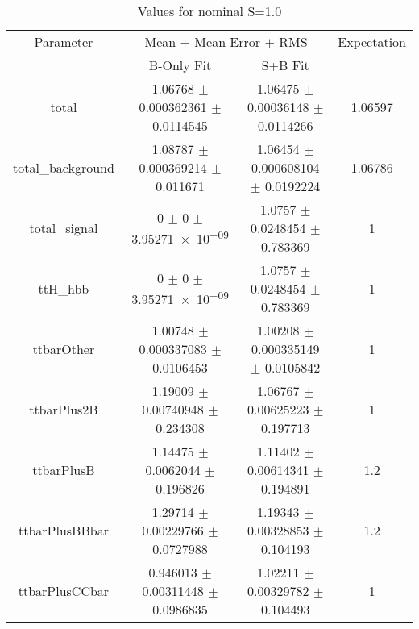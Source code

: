 \begin{table}
\centering
\caption{Values for nominal S=1.0}
\begin{tabular}{cccc}
\toprule
Parameter & \multicolumn{2}{c}{Mean $\pm$ Mean Error $\pm$ RMS} & Expectation\\
 & B-Only Fit & S+B Fit & \\
\midrule
total & \num{1.06768} $\pm$ \num{0.000362361} $\pm$ \num{0.0114545} & \num{1.06475} $\pm$ \num{0.00036148} $\pm$ \num{0.0114266} & \num{1.06597}\\
total\_background & \num{1.08787} $\pm$ \num{0.000369214} $\pm$ \num{0.011671} & \num{1.06454} $\pm$ \num{0.000608104} $\pm$ \num{0.0192224} & \num{1.06786}\\
total\_signal & \num{0} $\pm$ \num{0} $\pm$ \num{3.95271e-09} & \num{1.0757} $\pm$ \num{0.0248454} $\pm$ \num{0.783369} & \num{1}\\
ttH\_hbb & \num{0} $\pm$ \num{0} $\pm$ \num{3.95271e-09} & \num{1.0757} $\pm$ \num{0.0248454} $\pm$ \num{0.783369} & \num{1}\\
ttbarOther & \num{1.00748} $\pm$ \num{0.000337083} $\pm$ \num{0.0106453} & \num{1.00208} $\pm$ \num{0.000335149} $\pm$ \num{0.0105842} & \num{1}\\
ttbarPlus2B & \num{1.19009} $\pm$ \num{0.00740948} $\pm$ \num{0.234308} & \num{1.06767} $\pm$ \num{0.00625223} $\pm$ \num{0.197713} & \num{1}\\
ttbarPlusB & \num{1.14475} $\pm$ \num{0.0062044} $\pm$ \num{0.196826} & \num{1.11402} $\pm$ \num{0.00614341} $\pm$ \num{0.194891} & \num{1.2}\\
ttbarPlusBBbar & \num{1.29714} $\pm$ \num{0.00229766} $\pm$ \num{0.0727988} & \num{1.19343} $\pm$ \num{0.00328853} $\pm$ \num{0.104193} & \num{1.2}\\
ttbarPlusCCbar & \num{0.946013} $\pm$ \num{0.00311448} $\pm$ \num{0.0986835} & \num{1.02211} $\pm$ \num{0.00329782} $\pm$ \num{0.104493} & \num{1}\\
\bottomrule
\end{tabular}
\end{table}